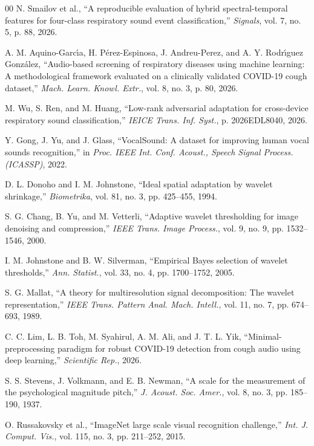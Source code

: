 \documentclass{ieeeaccess}
\begin{document}
\begin{thebibliography}{00}
N. Smailov et al., ``A reproducible evaluation of hybrid spectral-temporal features for four-class respiratory sound event classification,'' \emph{Signals}, vol. 7, no. 5, p. 88, 2026.

A. M. Aquino-Garc{\'\i}a, H. P{\'e}rez-Espinosa, J. Andreu-Perez, and A. Y. Rodr{\'\i}guez Gonz{\'a}lez, ``Audio-based screening of respiratory diseases using machine learning: A methodological framework evaluated on a clinically validated COVID-19 cough dataset,'' \emph{Mach. Learn. Knowl. Extr.}, vol. 8, no. 3, p. 80, 2026.

M. Wu, S. Ren, and M. Huang, ``Low-rank adversarial adaptation for cross-device respiratory sound classification,'' \emph{IEICE Trans. Inf. Syst.}, p. 2026EDL8040, 2026.

Y. Gong, J. Yu, and J. Glass, ``VocalSound: A dataset for improving human vocal sounds recognition,'' in \emph{Proc. IEEE Int. Conf. Acoust., Speech Signal Process. (ICASSP)}, 2022.

D. L. Donoho and I. M. Johnstone, ``Ideal spatial adaptation by wavelet shrinkage,'' \emph{Biometrika}, vol. 81, no. 3, pp. 425--455, 1994.

S. G. Chang, B. Yu, and M. Vetterli, ``Adaptive wavelet thresholding for image denoising and compression,'' \emph{IEEE Trans. Image Process.}, vol. 9, no. 9, pp. 1532--1546, 2000.

I. M. Johnstone and B. W. Silverman, ``Empirical Bayes selection of wavelet thresholds,'' \emph{Ann. Statist.}, vol. 33, no. 4, pp. 1700--1752, 2005.

S. G. Mallat, ``A theory for multiresolution signal decomposition: The wavelet representation,'' \emph{IEEE Trans. Pattern Anal. Mach. Intell.}, vol. 11, no. 7, pp. 674--693, 1989.

C. C. Lim, L. B. Toh, M. Syahirul, A. M. Ali, and J. T. L. Yik, ``Minimal-preprocessing paradigm for robust COVID-19 detection from cough audio using deep learning,'' \emph{Scientific Rep.}, 2026.

S. S. Stevens, J. Volkmann, and E. B. Newman, ``A scale for the measurement of the psychological magnitude pitch,'' \emph{J. Acoust. Soc. Amer.}, vol. 8, no. 3, pp. 185--190, 1937.

O. Russakovsky et al., ``ImageNet large scale visual recognition challenge,'' \emph{Int. J. Comput. Vis.}, vol. 115, no. 3, pp. 211--252, 2015.


\end{thebibliography}
\end{document}
